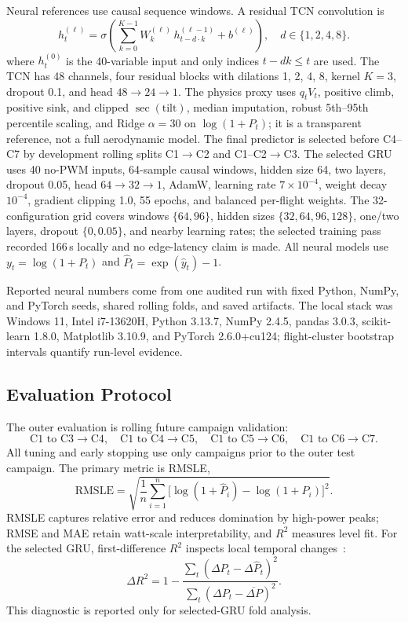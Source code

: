 \documentclass[runningheads,a4paper]{llncs}
\begin{document}
Neural references use causal sequence windows. A residual TCN convolution is
\begin{equation}
  h^{(\ell)}_t = \sigma\!\left(\sum_{k=0}^{K-1} W^{(\ell)}_k\, h^{(\ell-1)}_{t - d \cdot k} + b^{(\ell)}\right), \quad d \in \{1,2,4,8\}. \label{eq:tcn}
\end{equation}
where $h^{(0)}_t$ is the 40-variable input and only indices $t-dk\le t$ are used. The TCN has 48 channels, four residual blocks with dilations 1, 2, 4, 8, kernel $K=3$, dropout 0.1, and head $48 \to 24 \to 1$. The physics proxy uses $q_tV_t$, positive climb, positive sink, and clipped $\sec(\mathrm{tilt})$, median imputation, robust 5th--95th percentile scaling, and Ridge $\alpha=30$ on $\log(1+P_t)$; it is a transparent reference, not a full aerodynamic model. The final predictor is selected before C4--C7 by development rolling splits C1$\to$C2 and C1--C2$\to$C3. The selected GRU uses 40 no-PWM inputs, 64-sample causal windows, hidden size 64, two layers, dropout 0.05, head $64 \to 32 \to 1$, AdamW, learning rate $7\times10^{-4}$, weight decay $10^{-4}$, gradient clipping 1.0, 55 epochs, and balanced per-flight weights. The 32-configuration grid covers windows $\{64,96\}$, hidden sizes $\{32,64,96,128\}$, one/two layers, dropout $\{0,0.05\}$, and nearby learning rates; the selected training pass recorded 166\,s locally and no edge-latency claim is made. All neural models use $y_t=\log(1+P_t)$ and $\hat{P}_t=\exp(\hat{y}_t)-1$.

Reported neural numbers come from one audited run with fixed Python, NumPy, and PyTorch seeds, shared rolling folds, and saved artifacts. The local stack was Windows 11, Intel i7-13620H, Python 3.13.7, NumPy 2.4.5, pandas 3.0.3, scikit-learn 1.8.0, Matplotlib 3.10.9, and PyTorch 2.6.0+cu124; flight-cluster bootstrap intervals quantify run-level evidence.

\subsection{Evaluation Protocol}

The outer evaluation is rolling future campaign validation:
\[
  \text{C1 to C3}\to\text{C4},\quad
  \text{C1 to C4}\to\text{C5},\quad
  \text{C1 to C5}\to\text{C6},\quad
  \text{C1 to C6}\to\text{C7}.
\]
All tuning and early stopping use only campaigns prior to the outer test campaign. The primary metric is RMSLE,
\begin{equation}
  \mathrm{RMSLE} = \sqrt{\frac{1}{n}\sum_{i=1}^{n}\bigl[\log(1+\hat{P}_i) - \log(1+P_i)\bigr]^2}. \label{eq:rmsle}
\end{equation}
RMSLE captures relative error and reduces domination by high-power peaks; RMSE and MAE retain watt-scale interpretability, and $R^2$ measures level fit. For the selected GRU, first-difference $R^2$ inspects local temporal changes~\cite{hyndman2006forecast}:
\begin{equation}
  \Delta R^2 = 1 - \frac{\sum_t(\Delta P_t - \Delta\hat{P}_t)^2}{\sum_t(\Delta P_t - \overline{\Delta P})^2}. \label{eq:deltaR2}
\end{equation}
This diagnostic is reported only for selected-GRU fold analysis.
\end{document}
